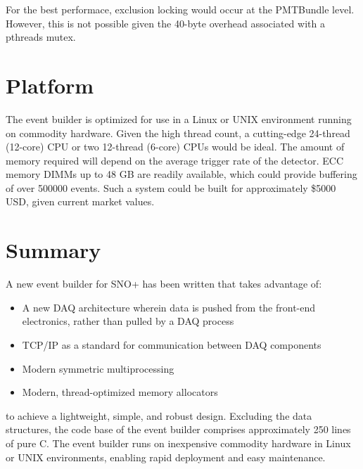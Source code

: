 \documentclass[11pt,twocolumn]{article}
\begin{document}
For the best performace, exclusion locking would occur at the PMTBundle level. However, this is not possible given the 40-byte overhead associated with a pthreads mutex.

\section{Platform}
The event builder is optimized for use in a Linux or UNIX environment running on commodity hardware. Given the high thread count, a cutting-edge 24-thread (12-core) CPU or two 12-thread (6-core) CPUs would be ideal. The amount of memory required will depend on the average trigger rate of the detector. ECC memory DIMMs up to 48 GB are readily available, which could provide buffering of over 500000 events. Such a system could be built for approximately \$5000 USD, given current market values.

\section{Summary}
A new event builder for SNO+ has been written that takes advantage of:
\begin{itemize}
\item A new DAQ architecture wherein data is pushed from the front-end electronics, rather than pulled by a DAQ process
\item TCP/IP as a standard for communication between DAQ components
\item Modern symmetric multiprocessing
\item Modern, thread-optimized memory allocators
\end{itemize}

to achieve a lightweight, simple, and robust design. Excluding the data structures, the code base of the event builder comprises approximately 250 lines of pure C. The event builder runs on inexpensive commodity hardware in Linux or UNIX environments, enabling rapid deployment and easy maintenance.
\end{document}
